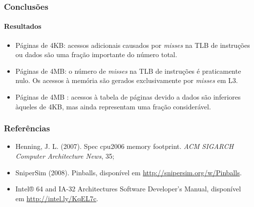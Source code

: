 \documentclass[10pt]{beamer}
\begin{document}
\begin{frame}
\frametitle{Conclusões}
\framesubtitle{Resultados}

\begin{itemize}
    \item Páginas de 4KB: acessos adicionais causados por \textit{misses} na TLB
    de instruções ou dados são uma fração importante do número total.

  \vspace{12pt}

  \item Páginas de 4MB: o número de \textit{misses} na TLB de instruções é
  praticamente nulo. Os acessos à memória são gerados exclusivamente por
  \textit{misses} em L3. 
  
  \vspace{12pt}

  \item Páginas de 4MB : acessos à tabela de
  páginas devido a dados são inferiores àqueles de 4KB, mas ainda representam
  uma fração considerável. 
\end{itemize}

\end{frame}


\begin{frame}
\frametitle{Referências}

\begin{itemize}
  \item Henning, J. L. (2007). Spec cpu2006 memory footprint. \textit{ACM
  SIGARCH Computer Architecture News}, 35;
  \vspace{14pt}
  \item SniperSim (2008). Pinballs, disponível em
  \url{http://snipersim.org/w/Pinballs}.
  \item Intel® 64 and IA-32 Architectures
Software Developer’s Manual, disponível em \url{http://intel.ly/KqEL7c}.
\end{itemize}

\end{frame}
\end{document}
